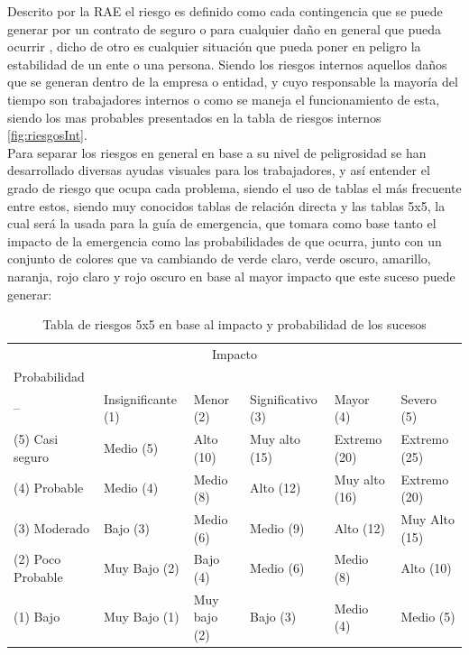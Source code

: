      Descrito por la RAE el riesgo es definido como cada contingencia que se puede generar por un contrato de seguro o para cualquier daño en general que pueda ocurrir \cite{RAE2}, dicho de otro es cualquier situación que pueda poner en peligro la estabilidad de un ente o una persona. Siendo los riesgos internos aquellos daños que se generan dentro de la empresa o entidad, y cuyo responsable la mayoría del tiempo son trabajadores internos o como se maneja el funcionamiento de esta, siendo los mas probables presentados en la tabla de riesgos internos \ref{fig:riesgosInt}. 
     \\Para separar los riesgos en general en base a su nivel de peligrosidad se han desarrollado diversas ayudas visuales para los trabajadores, y así entender el grado de riesgo que ocupa cada problema, siendo el uso de tablas el más frecuente entre estos, siendo muy conocidos tablas de relación directa y las tablas 5x5, la cual será la usada para la guía de emergencia, que tomara como base tanto el impacto de la emergencia como las probabilidades de que ocurra, junto con un conjunto de colores que va cambiando de verde claro, verde oscuro, amarillo, naranja, rojo claro y rojo oscuro en base al mayor impacto que este suceso puede generar:
     \begin{table}[H]
    \centering
    \caption{Tabla de riesgos 5x5 en base al impacto y probabilidad de los sucesos}
    \begin{tabular}{p{1.4cm} p{1.7cm} p{0.8cm} p{1.5cm} p{1cm} p{1cm}}
    \hline
    \multicolumn{6}{c}{Impacto}\\
    {Probabilidad}\\
    \hline
        -- & Insignificante (1) & Menor (2) & Significativo (3)  & Mayor (4) & Severo (5)\\
    \hline
        (5) Casi seguro & Medio (5) & Alto (10)  & Muy alto (15) & Extremo (20) & Extremo (25) \\
    \hline
        (4) Probable & Medio (4) & Medio (8)  & Alto (12) & Muy alto (16) & Extremo (20) \\
    \hline
        (3) Moderado & Bajo (3) & Medio (6)  & Medio (9) & Alto (12) & Muy Alto (15) \\
    \hline 
        (2) Poco Probable & Muy Bajo (2) & Bajo (4)  & Medio (6) & Medio (8) & Alto (10) \\
    \hline
        (1) Bajo & Muy Bajo (1) & Muy bajo (2)  & Bajo (3) & Medio (4) & Medio (5) \\
    \hline
    \end{tabular}
    \label{tab:riesgos}
\end{table}
 
